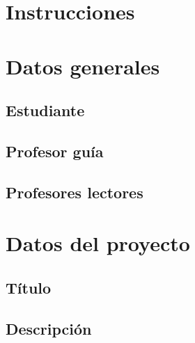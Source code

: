 \documentclass{anteproyecto}
\begin{document}

\encabezado

\section*{Instrucciones}

\instrucciones

\section*{Datos generales}

\subsection*{Estudiante}
\estudiante

\subsection*{Profesor guía}
\profesorguia

\subsection*{Profesores lectores}
\profesoreslectores

\section*{Datos del proyecto}

\subsection*{Título}
\eltitulo

\newpage

\subsection*{Descripción}

\ifvacio
	\vspace{4cm}
\else
\lipsum[1]
\fi
\end{document}
